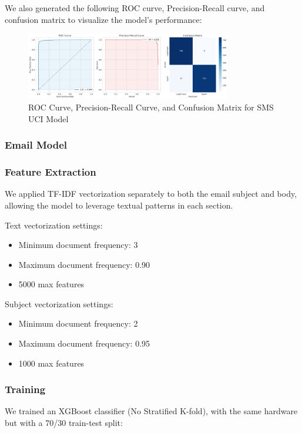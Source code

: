 \documentclass{article}
\begin{document}
\noindent
We also generated the following ROC curve, Precision-Recall curve, and confusion matrix to visualize the model's performance:
\begin{figure}[htbp]
    \centering
    \includegraphics[width=0.8\textwidth]{../analysis/sms/sms_uci_model_performance.png}
    \caption{ROC Curve, Precision-Recall Curve, and Confusion Matrix for SMS UCI Model}
    \label{fig:roc_curve_3}
\end{figure}

\subsubsection{Email Model}
\subsubsection*{Feature Extraction}
We applied TF-IDF vectorization separately to both the email subject and body, allowing the model to leverage textual patterns in each section.

Text vectorization settings:
\begin{itemize}
    \item Minimum document frequency: 3
    \item Maximum document frequency: 0.90
    \item 5000 max features
\end{itemize}

Subject vectorization settings:
\begin{itemize}
    \item Minimum document frequency: 2
    \item Maximum document frequency: 0.95
    \item 1000 max features
\end{itemize}

\subsubsection*{Training}
We trained an XGBoost classifier (No Stratified K-fold), with the same hardware but with a 70/30 train-test split:
\end{document}
